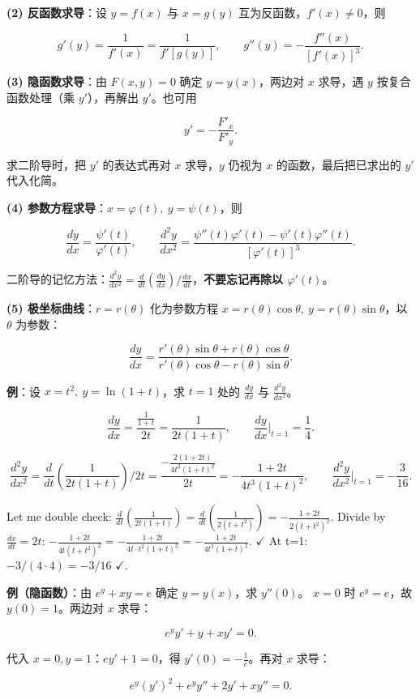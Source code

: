 \documentclass[11pt,openany,UTF8]{ctexbook}
\begin{document}
\textbf{(2) 反函数求导}：设 $y=f(x)$ 与 $x=g(y)$ 互为反函数，$f'(x)\ne0$，则

\[g'(y)=\frac{1}{f'(x)}=\frac{1}{f'[g(y)]},\qquad g''(y)=-\frac{f''(x)}{[f'(x)]^3}.\]

\textbf{(3) 隐函数求导}：由 $F(x,y)=0$ 确定 $y=y(x)$，两边对 $x$ 求导，遇 $y$ 按复合函数处理（乘 $y'$），再解出 $y'$。也可用

\[y'=-\frac{F'_x}{F'_y}.\]

求二阶导时，把 $y'$ 的表达式再对 $x$ 求导，$y$ 仍视为 $x$ 的函数，最后把已求出的 $y'$ 代入化简。

\textbf{(4) 参数方程求导}：$x=\varphi(t),\ y=\psi(t)$，则

\[\frac{dy}{dx}=\frac{\psi'(t)}{\varphi'(t)},\qquad
\frac{d^2y}{dx^2}=\frac{\psi''(t)\varphi'(t)-\psi'(t)\varphi''(t)}{[\varphi'(t)]^3}.\]

二阶导的记忆方法：$\frac{d^2y}{dx^2}=\frac{d}{dt}\!\left(\frac{dy}{dx}\right)\Big/\frac{dx}{dt}$，\textbf{不要忘记再除以 $\varphi'(t)$}。

\textbf{(5) 极坐标曲线}：$r=r(\theta)$ 化为参数方程 $x=r(\theta)\cos\theta,\ y=r(\theta)\sin\theta$，以 $\theta$ 为参数：

\[\frac{dy}{dx}=\frac{r'(\theta)\sin\theta+r(\theta)\cos\theta}{r'(\theta)\cos\theta-r(\theta)\sin\theta}.\]

\textbf{例}：设 $x=t^2,\ y=\ln(1+t)$，求 $t=1$ 处的 $\frac{dy}{dx}$ 与 $\frac{d^2y}{dx^2}$。

\[\frac{dy}{dx}=\frac{\frac{1}{1+t}}{2t}=\frac{1}{2t(1+t)},\qquad \frac{dy}{dx}\Big|_{t=1}=\frac14 .\]

\[\frac{d^2y}{dx^2}=\frac{d}{dt}\!\left(\frac{1}{2t(1+t)}\right)\Big/2t
=\frac{-\frac{2(1+2t)}{4t^2(1+t)^2}}{2t}
=-\frac{1+2t}{4t^3(1+t)^2},\qquad \frac{d^2y}{dx^2}\Big|_{t=1}=-\frac{3}{16}.\]

Let me double check: $\frac{d}{dt}\left(\frac{1}{2t(1+t)}\right) = \frac{d}{dt}\left(\frac{1}{2(t+t^2)}\right) = -\frac{1+2t}{2(t+t^2)^2}$. Divide by $\frac{dx}{dt}=2t$: $-\frac{1+2t}{4t(t+t^2)^2} = -\frac{1+2t}{4t\cdot t^2(1+t)^2}=-\frac{1+2t}{4t^3(1+t)^2}$. $\checkmark$ At t=1: $-3/(4\cdot4)=-3/16$ $\checkmark$.

\textbf{例（隐函数）}：由 $e^y+xy=e$ 确定 $y=y(x)$，求 $y''(0)$。 $x=0$ 时 $e^y=e$，故 $y(0)=1$。两边对 $x$ 求导：

\[e^y y'+y+xy'=0.\]

代入 $x=0,y=1$：$ey'+1=0$，得 $y'(0)=-\frac1e$。再对 $x$ 求导：

\[e^y(y')^2+e^yy''+2y'+xy''=0.\]
\end{document}
